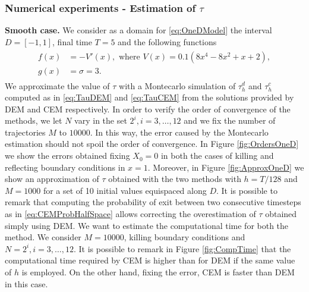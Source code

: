 \subsubsection{Numerical experiments - Estimation of $\tau$}

\textbf{Smooth case.} We consider as a domain for \eqref{eq:OneDModel} the interval $D = \left[-1,1\right]$, final time $T = 5$ and the following functions
\begin{align}\label{eq:FunctionsOneDSmooth}
\begin{split}
	f(x) &= -V'(x), \text{ where } V(x) = 0.1(8x^4 - 8x^2 + x + 2), \\
	g(x) &= \sigma = 3.
\end{split}
\end{align}
We approximate the value of $\tau$ with a Montecarlo simulation of $\tau_h^d$ and $\tau_h^c$ computed as in \eqref{eq:TauDEM} and \eqref{eq:TauCEM} from the solutions provided by DEM and CEM respectively. In order to verify the order of convergence of the methods, we let $N$ vary in the set $2^i,i=3,\dots,12$ and we fix the number of trajectories $M$ to $10000$. In this way, the error caused by the Montecarlo estimation should not spoil the order of convergence. In Figure \ref{fig:OrdersOneD} we show the errors obtained fixing $X_0 = 0$ in both the cases of killing and reflecting boundary conditions in $x = 1$. Moreover, in Figure \ref{fig:ApproxOneD} we show an approximation of $\tau$ obtained with the two methods with $h = T/128$ and $M = 1000$ for a set of 10 initial values equispaced along $D$. It is possible to remark that computing the probability of exit between two consecutive timesteps as in \eqref{eq:CEMProbHalfSpace} allows correcting the overestimation of $\tau$ obtained simply using DEM. We want to estimate the computational time for both the method. We consider $M = 10000$, killing boundary conditions and $N = 2^i, i = 3,\dots,12$. It is possible to remark in Figure \ref{fig:CompTime} that the computational time required by CEM is higher than for DEM if the same value of $h$ is employed. On the other hand, fixing the error, CEM is faster than DEM in this case.



